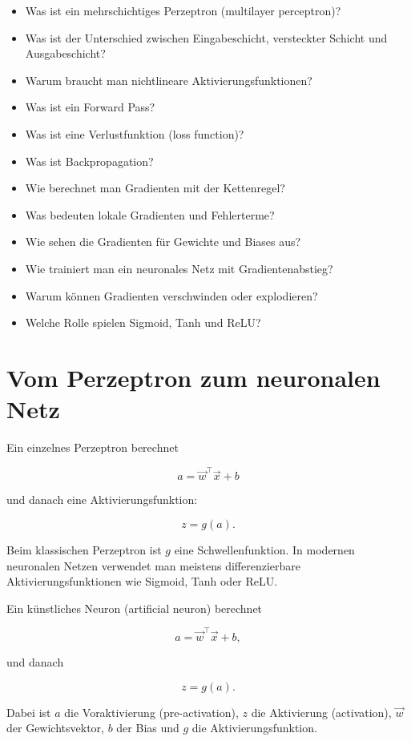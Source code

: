\begin{itemize}
    \item Was ist ein mehrschichtiges Perzeptron (multilayer perceptron)?
    \item Was ist der Unterschied zwischen Eingabeschicht, versteckter Schicht und Ausgabeschicht?
    \item Warum braucht man nichtlineare Aktivierungsfunktionen?
    \item Was ist ein Forward Pass?
    \item Was ist eine Verlustfunktion (loss function)?
    \item Was ist Backpropagation?
    \item Wie berechnet man Gradienten mit der Kettenregel?
    \item Was bedeuten lokale Gradienten und Fehlerterme?
    \item Wie sehen die Gradienten für Gewichte und Biases aus?
    \item Wie trainiert man ein neuronales Netz mit Gradientenabstieg?
    \item Warum können Gradienten verschwinden oder explodieren?
    \item Welche Rolle spielen Sigmoid, Tanh und ReLU?
\end{itemize}

\section{Vom Perzeptron zum neuronalen Netz}

Ein einzelnes Perzeptron berechnet

\[
    a
    =
    \vec{w}^{\top}\vec{x}+b
\]

und danach eine Aktivierungsfunktion:

\[
    z
    =
    g(a).
\]

Beim klassischen Perzeptron ist \(g\) eine Schwellenfunktion.
In modernen neuronalen Netzen verwendet man meistens differenzierbare Aktivierungsfunktionen wie Sigmoid, Tanh oder ReLU.

\begin{definitionbox}
Ein künstliches Neuron (artificial neuron) berechnet

\[
    a
    =
    \vec{w}^{\top}\vec{x}+b,
\]

und danach

\[
    z
    =
    g(a).
\]

Dabei ist \(a\) die Voraktivierung (pre-activation), \(z\) die Aktivierung (activation), \(\vec{w}\) der Gewichtsvektor, \(b\) der Bias und \(g\) die Aktivierungsfunktion.
\end{definitionbox}

